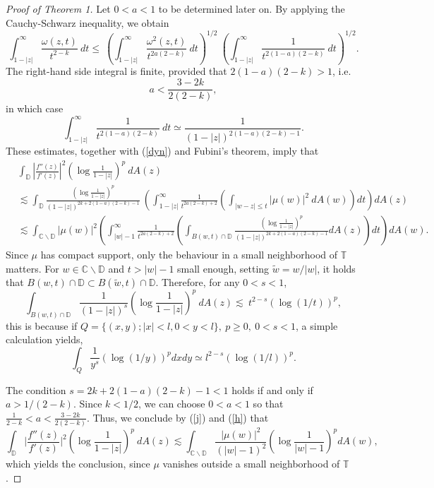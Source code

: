 \documentclass[12pt,a4paper]{article}
\theoremstyle{definition}
\theoremstyle{remark}
\newcommand{\C}{\mathbb{C}}
\newcommand{\D}{\mathbb{D}}
\newcommand{\T}{\mathbb{T}}
\numberwithin{komcounter}{section}
\begin{document}
\begin{proof}[Proof of Theorem 1]
	Let $0<a<1$ to be determined later on. By applying the Cauchy-Schwarz inequality, we obtain	
	$$
	\int_{1-|z|}^{\infty}
	\frac{\omega(z,t)}{t^{2-k}}~ dt \leq ~ \left(\int_{1-|z|}^{\infty}
	\frac{\omega^2(z,t)}{t^{2a(2-k)}}~ dt\right)^{1/2} ~	\left(\int_{1-|z|}^{\infty}
	\frac{1}{t^{2(1-a)(2-k)}}~ dt\right)^{1/2}.
	$$
	The right-hand side integral is finite, provided that $2(1-a)(2-k)>1$, i.e.
	$$
	a<\frac{3-2k}{2(2-k)},
	$$	
	in which case
	$$
	\int_{1-|z|}^{\infty}
	\frac{1}{t^{2(1-a)(2-k)}}~ dt\simeq\frac{1}{(1-|z|)^{2(1-a)(2-k)-1}}.
	$$
	\noindent
	These estimates, together with  (\ref{dyn}) and Fubini's theorem, imply that
	\begin{align}
	&\int_{\D} \left\vert\frac{f''(z)}{f'(z)}\right\vert^2 \left( \log \frac{1}{1-|z|}    \right)^p~dA(z)\nonumber\\&\lesssim \int_{\D}\frac{\left( \log \frac{1}{1-|z|}  \right   )^p}{(1-|z|)^{2k+2(1-a)(2-k)-1}}~\left(	 \int_{1-|z|}^{\infty}
	\frac{1}{t^{2a(2-k)+2}} \left(\int_{|w-z|\leq t} |\mu(w)|^2 ~dA(w)\right) dt\right) dA(z) \nonumber\\
	&\lesssim\int_{\C\backslash \D} |\mu(w)|^2\left(\int_{|w|-1}^\infty\frac{1}{t^{2a(2-k)+2}}
	\left(\int_{B(w,t) \cap \D}\frac{\left( \log \frac{1}{1-|z|}\right     )^p}{(1-|z|)^{2k+2(1-a)(2-k)-1}} dA(z)\right)dt\right)dA(w). \label{j}
	\end{align}
	\noindent
	Since $\mu$ has compact support, only the behaviour in a small neighborhood  of $\T$ matters. For $w\in \C\backslash \D $ and $t>|w|-1$ small enough, setting $\tilde{w}=w/|w|$, it holds that $B(w,t)\cap \D \subset B(\tilde{w}, t)\cap \D$. Therefore,  for any $0<s<1$, 
	\begin{equation}\label{h}
	\int_{B(w,t) \cap \D}\frac{1}{(1-|z|)^{s}} \left( \log \frac{1}{1-|z|}     \right)^p~dA(z) \lesssim ~ t^{2-s}( \log (1/t) )^p,
	\end{equation}
	this is because if   $Q=\{(x,y); |x|<l, 0<y<l\},~p\geq 0,~0<s<1$, a simple calculation yields,
$$\int_Q \frac{1}{y^{s}} (\log (1/y))^p dx dy\simeq l^{2-s} (\log (1/l))^p.$$


The condition   $s= 2k+2(1-a)(2-k)-1<1$ holds if and only if $a>1/(2-k)$. Since $k<1/2$, we can choose $0<a<1$ so that $\frac{1}{2-k}<a<\frac{3-2k}{2(2-k)}$.
	Thus, we conclude by (\ref{j}) and  (\ref{h}) that 
	$$
	\int_{\D}	\bigg\vert\frac{f''(z)}{f'(z)}\bigg\vert^2 \left( \log \frac{1}{1-|z|}    \right)^p ~dA(z)\lesssim
	\int_{\C\backslash \D} \frac{|\mu(w)|^2}{(|w|-1)^2} \left( \log \frac{1}{|w|-1}    \right)^p dA(w),
	$$
	which yields the conclusion, since $\mu$ vanishes outside a small neighborhood of $\T$.
	\end{proof}
	
\end{document}
